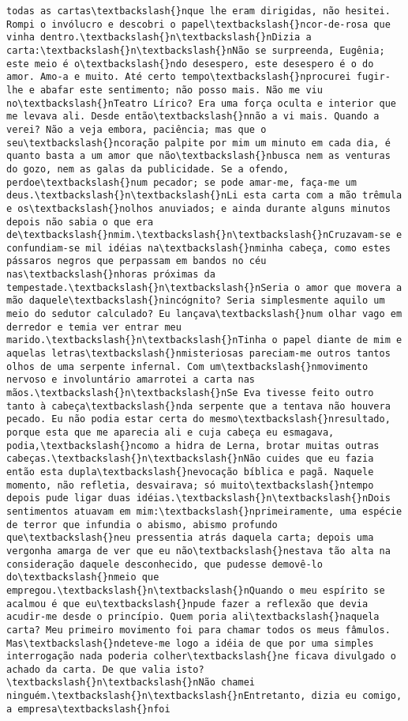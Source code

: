 \begin{Verbatim}[commandchars=\\\{\}]
todas as cartas\textbackslash{}nque lhe eram dirigidas, não hesitei. Rompi o invólucro e descobri o papel\textbackslash{}ncor-de-rosa que vinha dentro.\textbackslash{}n\textbackslash{}nDizia a carta:\textbackslash{}n\textbackslash{}nNão se surpreenda, Eugênia; este meio é o\textbackslash{}ndo desespero, este desespero é o do amor. Amo-a e muito. Até certo tempo\textbackslash{}nprocurei fugir-lhe e abafar este sentimento; não posso mais. Não me viu no\textbackslash{}nTeatro Lírico? Era uma força oculta e interior que me levava ali. Desde então\textbackslash{}nnão a vi mais. Quando a verei? Não a veja embora, paciência; mas que o seu\textbackslash{}ncoração palpite por mim um minuto em cada dia, é quanto basta a um amor que não\textbackslash{}nbusca nem as venturas do gozo, nem as galas da publicidade. Se a ofendo, perdoe\textbackslash{}num pecador; se pode amar-me, faça-me um deus.\textbackslash{}n\textbackslash{}nLi esta carta com a mão trêmula e os\textbackslash{}nolhos anuviados; e ainda durante alguns minutos depois não sabia o que era de\textbackslash{}nmim.\textbackslash{}n\textbackslash{}nCruzavam-se e confundiam-se mil idéias na\textbackslash{}nminha cabeça, como estes pássaros negros que perpassam em bandos no céu nas\textbackslash{}nhoras próximas da tempestade.\textbackslash{}n\textbackslash{}nSeria o amor que movera a mão daquele\textbackslash{}nincógnito? Seria simplesmente aquilo um meio do sedutor calculado? Eu lançava\textbackslash{}num olhar vago em derredor e temia ver entrar meu marido.\textbackslash{}n\textbackslash{}nTinha o papel diante de mim e aquelas letras\textbackslash{}nmisteriosas pareciam-me outros tantos olhos de uma serpente infernal. Com um\textbackslash{}nmovimento nervoso e involuntário amarrotei a carta nas mãos.\textbackslash{}n\textbackslash{}nSe Eva tivesse feito outro tanto à cabeça\textbackslash{}nda serpente que a tentava não houvera pecado. Eu não podia estar certa do mesmo\textbackslash{}nresultado, porque esta que me aparecia ali e cuja cabeça eu esmagava, podia,\textbackslash{}ncomo a hidra de Lerna, brotar muitas outras cabeças.\textbackslash{}n\textbackslash{}nNão cuides que eu fazia então esta dupla\textbackslash{}nevocação bíblica e pagã. Naquele momento, não refletia, desvairava; só muito\textbackslash{}ntempo depois pude ligar duas idéias.\textbackslash{}n\textbackslash{}nDois sentimentos atuavam em mim:\textbackslash{}nprimeiramente, uma espécie de terror que infundia o abismo, abismo profundo que\textbackslash{}neu pressentia atrás daquela carta; depois uma vergonha amarga de ver que eu não\textbackslash{}nestava tão alta na consideração daquele desconhecido, que pudesse demovê-lo do\textbackslash{}nmeio que empregou.\textbackslash{}n\textbackslash{}nQuando o meu espírito se acalmou é que eu\textbackslash{}npude fazer a reflexão que devia acudir-me desde o princípio. Quem poria ali\textbackslash{}naquela carta? Meu primeiro movimento foi para chamar todos os meus fâmulos. Mas\textbackslash{}ndeteve-me logo a idéia de que por uma simples interrogação nada poderia colher\textbackslash{}ne ficava divulgado o achado da carta. De que valia isto?\textbackslash{}n\textbackslash{}nNão chamei ninguém.\textbackslash{}n\textbackslash{}nEntretanto, dizia eu comigo, a empresa\textbackslash{}nfoi 
\end{Verbatim}
